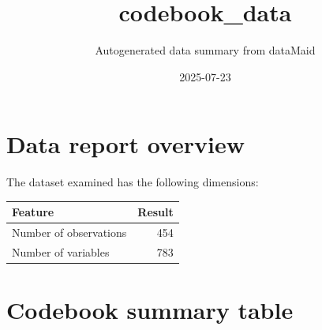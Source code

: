 \documentclass[
  letterpaper,
  DIV=11,
  numbers=noendperiod]{scrartcl}
\title{codebook\_data}
\subtitle{Autogenerated data summary from dataMaid}
\author{}
\date{2025-07-23}
\begin{document}
\maketitle


\section{Data report overview}\label{data-report-overview}

The dataset examined has the following dimensions:

\begin{longtable}[]{@{}lr@{}}
\toprule\noalign{}
Feature & Result \\
\midrule\noalign{}
\endhead
\bottomrule\noalign{}
\endlastfoot
Number of observations & 454 \\
Number of variables & 783 \\
\end{longtable}

\section{Codebook summary table}\label{codebook-summary-table}
\end{document}
